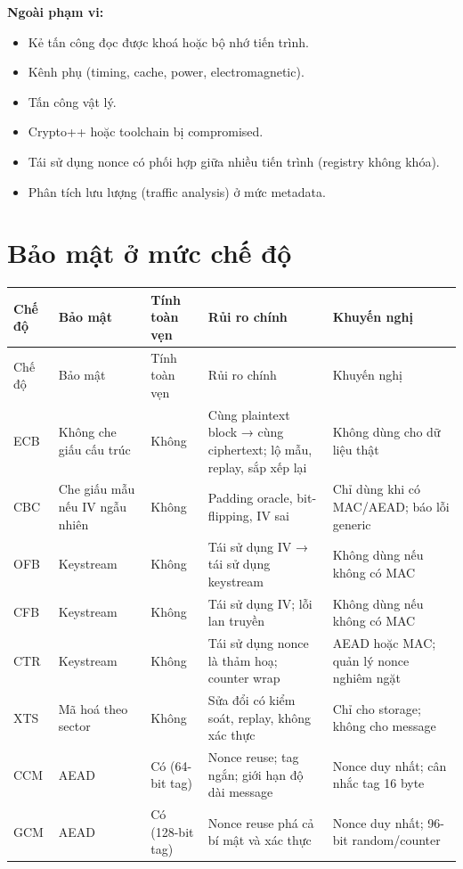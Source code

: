 \documentclass[12pt,a4paper,oneside]{report}
\begin{document}
\textbf{Ngoài phạm vi:}


\begin{itemize}[leftmargin=*]
\item Kẻ tấn công đọc được khoá hoặc bộ nhớ tiến trình.
\item Kênh phụ (timing, cache, power, electromagnetic).
\item Tấn công vật lý.
\item Crypto++ hoặc toolchain bị compromised.
\item Tái sử dụng nonce có phối hợp giữa nhiều tiến trình (registry không khóa).
\item Phân tích lưu lượng (traffic analysis) ở mức metadata.
\end{itemize}


\section{Bảo mật ở mức chế độ}


\begin{longtable}{p{}p{}p{}p{}p{}}
\toprule
Chế độ & Bảo mật & Tính toàn vẹn & Rủi ro chính & Khuyến nghị \\
\midrule
\endfirsthead
\toprule
Chế độ & Bảo mật & Tính toàn vẹn & Rủi ro chính & Khuyến nghị \\
\midrule
\endhead
ECB & Không che giấu cấu trúc & Không & Cùng plaintext block → cùng ciphertext; lộ mẫu, replay, sắp xếp lại & Không dùng cho dữ liệu thật \\
CBC & Che giấu mẫu nếu IV ngẫu nhiên & Không & Padding oracle, bit-flipping, IV sai & Chỉ dùng khi có MAC/AEAD; báo lỗi generic \\
OFB & Keystream & Không & Tái sử dụng IV → tái sử dụng keystream & Không dùng nếu không có MAC \\
CFB & Keystream & Không & Tái sử dụng IV; lỗi lan truyền & Không dùng nếu không có MAC \\
CTR & Keystream & Không & Tái sử dụng nonce là thảm hoạ; counter wrap & AEAD hoặc MAC; quản lý nonce nghiêm ngặt \\
XTS & Mã hoá theo sector & Không & Sửa đổi có kiểm soát, replay, không xác thực & Chỉ cho storage; không cho message \\
CCM & AEAD & Có (64-bit tag) & Nonce reuse; tag ngắn; giới hạn độ dài message & Nonce duy nhất; cân nhắc tag 16 byte \\
GCM & AEAD & Có (128-bit tag) & Nonce reuse phá cả bí mật và xác thực & Nonce duy nhất; 96-bit random/counter \\
\bottomrule
\end{longtable}
\end{document}
